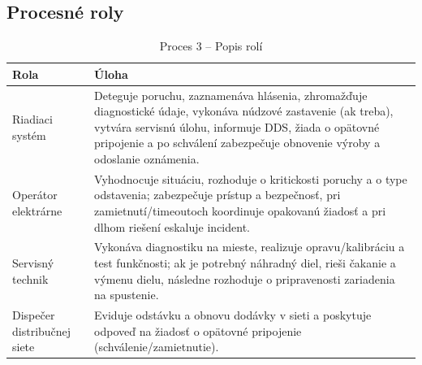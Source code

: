 \documentclass[12pt,a4paper]{article}
\begin{document}
\subsection{Procesné roly}
\begin{table}[H]
  \centering
  \renewcommand{\arraystretch}{1.2}
  \begin{tabularx}{\textwidth}{|p{}|X|}
    \hline
    \textbf{Rola} & \textbf{Úloha} \\
    \hline
    Riadiaci systém & Deteguje poruchu, zaznamenáva hlásenia, zhromažďuje diagnostické údaje, vykonáva núdzové zastavenie (ak treba), vytvára servisnú úlohu, informuje DDS, žiada o opätovné pripojenie a po schválení zabezpečuje obnovenie výroby a odoslanie oznámenia. \\
    \hline
    Operátor elektrárne & Vyhodnocuje situáciu, rozhoduje o kritickosti poruchy a o type odstavenia; zabezpečuje prístup a bezpečnosť, pri zamietnutí/timeoutoch koordinuje opakovanú žiadosť a pri dlhom riešení eskaluje incident. \\
    \hline
    Servisný technik & Vykonáva diagnostiku na mieste, realizuje opravu/kalibráciu a test funkčnosti; ak je potrebný náhradný diel, rieši čakanie a výmenu dielu, následne rozhoduje o pripravenosti zariadenia na spustenie. \\
    \hline
    Dispečer distribučnej siete & Eviduje odstávku a obnovu dodávky v sieti a poskytuje odpoveď na žiadosť o opätovné pripojenie (schválenie/zamietnutie). \\
    \hline
  \end{tabularx}
  \caption{Proces 3 -- Popis rolí}
\end{table}
\end{document}
